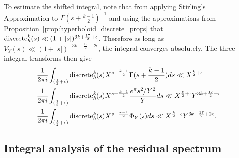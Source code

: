 To estimate the shifted integral, note that from applying Stirling's Approximation to
$\Gamma(s+\frac{k-1}{2})^{-1}$ and using the approximations from
Proposition~\ref{prop:hyperboloid_discrete_props} that $\operatorname{discrete}_h^k(s) \ll (1 + \lvert s
\rvert)^{3k + \frac{17}{2} +\epsilon}$.
Therefore as long as $V_Y(s) \ll (1 + \lvert s \rvert)^{-3k - \frac{19}{2} - 2\epsilon}$,
the integral converges absolutely.
The three integral transforms then give
\begin{align}
  &\frac{1}{2\pi i} \int_{(\frac{1}{2} + \epsilon)} \operatorname{discrete}_h^k(s) X^{s + \frac{k-1}{2}}
  \Gamma(s + \frac{k-1}{2})  ds \ll X^{\frac{k}{2} + \epsilon}
  \label{eq:hyperboloid:discrete_gamma_integral_bound}\\
  &\frac{1}{2\pi i} \int_{(\frac{1}{2} + \epsilon)} \operatorname{discrete}_h^k(s) X^{s + \frac{k-1}{2}}
  \frac{e^\pi s^2/Y^2}{Y} ds \ll X^{\frac{k}{2} + \epsilon} Y^{3k + \frac{17}{2} + \epsilon}
  \label{eq:hyperboloid:discrete_concentrating_integral_bound} \\
  &\frac{1}{2\pi i} \int_{(\frac{1}{2} + \epsilon)} \operatorname{discrete}_h^k(s) X^{s + \frac{k-1}{2}}
  \Phi_Y(s) ds \ll X^{\frac{k}{2}+ \epsilon} Y^{3k + \frac{17}{2} + 2\epsilon}.
  \label{eq:hyperboloid:discrete_compact_integral_bound}
\end{align}


\subsection{Integral analysis of the residual spectrum}


